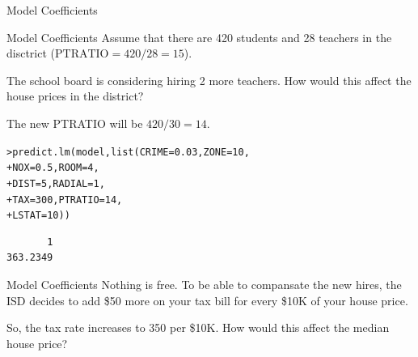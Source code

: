 \documentclass{beamer}\usepackage[]{graphicx}\usepackage[]{color}
\makeatletter
\newcommand{\hlnum}[1]{\textcolor[rgb]{0.824,0.412,0.118}{#1}}%
\newcommand{\hlstd}[1]{\textcolor[rgb]{1,0.894,0.769}{#1}}%
\newcommand{\hlkwc}[1]{\textcolor[rgb]{0.78,0.941,0.545}{#1}}%
\newcommand{\hlkwd}[1]{\textcolor[rgb]{1,0.78,0.769}{#1}}%
\newenvironment{kframe}{%
 \def\at@end@of@kframe{}%
 \ifinner\ifhmode%
  \def\at@end@of@kframe{\end{minipage}}%
  \begin{minipage}{\columnwidth}%
 \fi\fi%
 \def\FrameCommand##1{\hskip\@totalleftmargin \hskip-\fboxsep
 \colorbox{shadecolor}{##1}\hskip-\fboxsep
     \hskip-\linewidth \hskip-\@totalleftmargin \hskip\columnwidth}%
 \MakeFramed {\advance\hsize-\width
   \@totalleftmargin\z@ \linewidth\hsize
   \@setminipage}}%
 {\par\unskip\endMakeFramed%
 \at@end@of@kframe}
\newenvironment{knitrout}{}{} %
\makeatother
\begin{document}
\begin{darkframes}
\begin{frame}[fragile]{Model Coefficients}
    \end{frame}
    
    
    \begin{frame}[fragile]{Model Coefficients}
    \fontsize{9}{9}\selectfont
      Assume that there are 420 students and 28 teachers in the disctrict ($\text{PTRATIO}=420/28=15$). \pause
      
      \bigskip
      
      The school board is considering hiring 2 more teachers. How would this affect the house prices in the district? \pause
      
      \bigskip
      
      The new PTRATIO will be $420/30=14$. \pause
      
\begin{knitrout}
\begin{kframe}
\begin{alltt}
\hlstd{> }\hlkwd{predict.lm}\hlstd{(model,} \hlkwd{list}\hlstd{(}\hlkwc{CRIME}\hlstd{=}\hlnum{0.03}\hlstd{,} \hlkwc{ZONE}\hlstd{=}\hlnum{10}\hlstd{,}
\hlstd{+ }                       \hlkwc{NOX}\hlstd{=}\hlnum{0.5}\hlstd{,} \hlkwc{ROOM}\hlstd{=}\hlnum{4}\hlstd{,}
\hlstd{+ }                       \hlkwc{DIST}\hlstd{=}\hlnum{5}\hlstd{,}  \hlkwc{RADIAL}\hlstd{=}\hlnum{1}\hlstd{,}
\hlstd{+ }                       \hlkwc{TAX}\hlstd{=}\hlnum{300}\hlstd{,} \hlkwc{PTRATIO}\hlstd{=}\hlnum{14}\hlstd{,}
\hlstd{+ }                       \hlkwc{LSTAT}\hlstd{=}\hlnum{10}\hlstd{))}
\end{alltt}
\begin{verbatim}
       1 
363.2349 
\end{verbatim}
\end{kframe}
\end{knitrout}
    \end{frame}
    
    
    
    \begin{frame}[fragile]{Model Coefficients}
      Nothing is free. To be able to compansate the new hires, the ISD decides to add \$50 more on your tax bill for every \$10K of your house price. \pause
      
      \bigskip
      So, the tax rate increases to 350 per \$10K. How would this affect the median house price?
      
      \lc
    
    \end{frame}
    

\end{darkframes}
\end{document}

